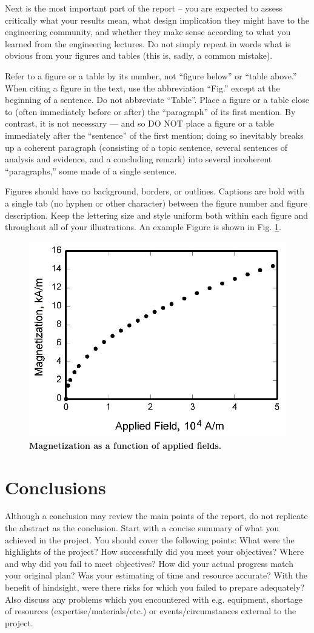 \documentclass{engr1000j-s2}
\begin{document}
  Next is the most important part of the report – you are expected to assess critically what your results mean, what design implication they might have to the engineering community, and whether they make sense according to what you learned from the engineering lectures. Do not simply repeat in words what is obvious from your figures and tables (this is, sadly, a common mistake). 

  Refer to a figure or a table by its number, not “figure below” or “table above.” When citing a figure in the text, use the abbreviation “Fig.” except at the beginning of a sentence. Do not abbreviate “Table”.  Place a figure or a table close to (often immediately before or after) the “paragraph” of its first mention. By contrast, it is not necessary --- and so DO NOT place a figure or a table immediately after the “sentence” of the first mention; doing so inevitably breaks up a coherent paragraph (consisting of a topic sentence, several sentences of analysis and evidence, and a concluding remark) into several incoherent “paragraphs,” some made of a single sentence.
  
  Figures should have no background, borders, or outlines. Captions are bold with a single tab (no hyphen or other character) between the figure number and figure description. Keep the lettering size and style uniform both within each figure and throughout all of your illustrations.  An example Figure is shown in Fig. \ref{fig:graph}.


  \begin{figure}[hbt!]  
  \centering
  \includegraphics[width=.5\textwidth]{figures/graph.jpg}
  \caption{\quad \textbf{Magnetization as a function of applied fields.}}
  \label{fig:graph}
  \end{figure}
  \hspace{1em}

  \section{Conclusions}
  Although a conclusion may review the main points of the report, do not replicate the abstract as the conclusion. Start with a concise summary of what you achieved in the project. You should cover the following points: What were the highlights of the project? How successfully did you meet your objectives? Where and why did you fail to meet objectives? How did your actual progress match your original plan? Was your estimating of time and resource accurate? With the benefit of hindsight, were there risks for which you failed to prepare adequately? Also discuss any problems which you encountered with e.g. equipment, shortage of resources (expertise/materials/etc.) or events/circumstances external to the project.
\end{document}
